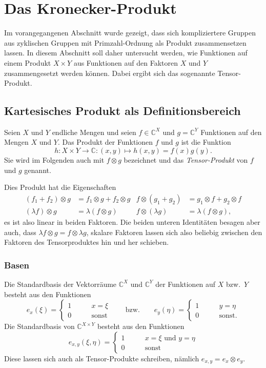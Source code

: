%
%
%
\section{Das Kronecker-Produkt
\label{buch:diskret:section:tensor}}
Im vorangegangenen Abschnitt wurde gezeigt, dass sich kompliziertere
Gruppen aus zyklischen Gruppen mit Primzahl-Ordnung als Produkt
zusammensetzen lassen.
In diesem Abschnitt soll daher untersucht werden, wie Funktionen auf
einem Produkt $X\times Y$ aus Funktionen auf den Faktoren $X$ und $Y$
zusammengesetzt werden können.
Dabei ergibt sich das sogenannte Tensor-Produkt.

%
%
%
\subsection{Kartesisches Produkt als Definitionsbereich
\label{buch:diskret:section:}}
Seien $X$ und $Y$ endliche Mengen und seien $f\in\mathbb{C}^X$ und 
$g=\mathbb{C}^Y$ Funktionen auf den Mengen $X$ und $Y$.
Das Produkt der Funktionen $f$ und $g$ ist die Funktion
\[
h
\colon
X\times Y \to \mathbb{C}
:
(x,y)
\mapsto
h(x,y) = f(x)g(y).
\]
Sie wird im Folgenden auch mit $f\otimes g$ bezeichnet und das
{\em Tensor-Produkt} von $f$ und $g$ genannt.

Dies Produkt hat die Eigenschaften
\begin{align*}
(f_1+f_2)\otimes g &= f_1\otimes g + f_2\otimes g
&
f\otimes(g_1+g_2) &= g_1\otimes f + g_2\otimes f
\\
(\lambda f)\otimes g &= \lambda (f\otimes g)
&
f\otimes(\lambda g) &= \lambda (f\otimes g),
\end{align*}
es ist also linear in beiden Faktoren.
Die beiden unteren Identitäten besagen aber auch, dass
$\lambda f\otimes g = f\otimes \lambda g$, skalare Faktoren
lassen sich also beliebig zwischen den Faktoren des
Tensorproduktes hin und her schieben.

%
%
\subsubsection{Basen}
Die Standardbasis der Vektorräume $\mathbb{C}^X$ und $\mathbb{C}^Y$
der Funktionen auf $X$ bzw.~$Y$
besteht aus den Funktionen
\[
e_x(\xi)
=
\begin{cases}
1&\qquad x=\xi\\
0&\qquad\text{sonst}
\end{cases}
\qquad\text{bzw.}\qquad
e_y(\eta)
=
\begin{cases}
1&\qquad y=\eta\\
0&\qquad\text{sonst.}
\end{cases}
\]
Die Standardbasis von $\mathbb{C}^{X\times Y}$ besteht aus den Funktionen
\[
e_{x,y}(\xi,\eta)
=
\begin{cases}
1&\qquad\text{$x=\xi$ und $y=\eta$}\\
0&\qquad\text{sonst}
\end{cases}
\]
Diese lassen sich auch als Tensor-Produkte schreiben, nämlich
$e_{x,y} = e_x\otimes e_y$.

